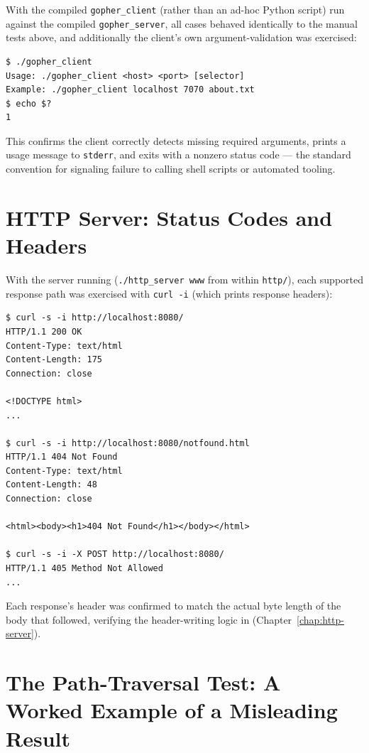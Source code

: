 With the compiled \texttt{gopher\_client} (rather than an ad-hoc Python script) run against the compiled \texttt{gopher\_server}, all cases behaved identically to the manual tests above, and additionally the client's own argument-validation was exercised:

\begin{lstlisting}[style=bashstyle, numbers=none]
$ ./gopher_client
Usage: ./gopher_client <host> <port> [selector]
Example: ./gopher_client localhost 7070 about.txt
$ echo $?
1
\end{lstlisting}

This confirms the client correctly detects missing required arguments, prints a usage message to \texttt{stderr}, and exits with a nonzero status code --- the standard convention for signaling failure to calling shell scripts or automated tooling.

\section{HTTP Server: Status Codes and Headers}

With the server running (\texttt{./http\_server www} from within \texttt{http/}), each supported response path was exercised with \texttt{curl -i} (which prints response headers):

\begin{lstlisting}[style=bashstyle, numbers=none]
$ curl -s -i http://localhost:8080/
HTTP/1.1 200 OK
Content-Type: text/html
Content-Length: 175
Connection: close

<!DOCTYPE html>
...

$ curl -s -i http://localhost:8080/notfound.html
HTTP/1.1 404 Not Found
Content-Type: text/html
Content-Length: 48
Connection: close

<html><body><h1>404 Not Found</h1></body></html>

$ curl -s -i -X POST http://localhost:8080/
HTTP/1.1 405 Method Not Allowed
...
\end{lstlisting}

Each response's  header was confirmed to match the actual byte length of the body that followed, verifying the header-writing logic in  (Chapter~\ref{chap:http-server}).

\section{The Path-Traversal Test: A Worked Example of a Misleading Result}

